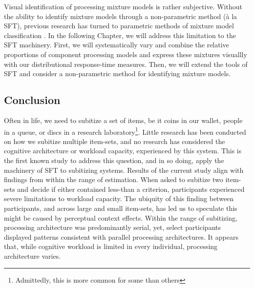 Visual identification of processing mixture models is rather subjective. Without the ability to identify mixture models through a non-parametric method (à la SFT), previous research has turned to parametric methods of mixture model classification \cite{Little2011, Moneer2016, Cheng2017}. In the following Chapter, we will address this limitation to the SFT machinery. First, we will systematically vary and combine the relative proportions of component processing models and express these mixtures visuallly with our distributional response-time measures. Then, we will extend the tools of SFT and consider a non-parametric method for identifying mixture models. 
\color{black}

\subsection{Conclusion}
Often in life, we need to subitize a set of items, be it coins in our wallet, people in a queue, or discs in a research laboratory\footnote{Admittedly, this is more common for some than others}. Little research has been conducted on how we subitize multiple item-sets, and no research has considered the cognitive architecture or workload capacity, experienced by this system. This is the first known study to address this question, and in so doing, apply the machinery of SFT to subitizing systems. Results of the current study align with findings from within the range of estimation. When asked to subitize two item-sets and decide if either contained less-than a criterion, participants experienced severe limitations to workload capacity. The ubiquity of this finding between participants, and across large and small item-sets, has led us to speculate this might be caused by perceptual context effects. Within the range of subitizing, processing architecture was predominantly serial, yet, select participants displayed patterns consistent with parallel processing architectures. It appears that, while cognitive workload is limited in every individual, processing architecture varies. 

